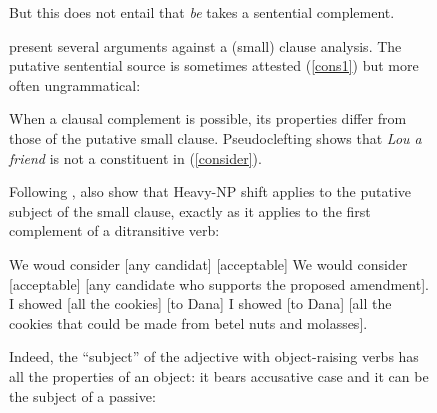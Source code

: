 \documentclass[output=paper
                ,modfonts
                ,nonflat
	        ,collection
	        ,collectionchapter
	        ,collectiontoclongg
 	        ,biblatex
                ,babelshorthands
                ,newtxmath
                ,draftmode
                ,colorlinks, citecolor=brown
]{./langsci/langscibook}
\begin{document}
\begin{figure}
But this does not entail that \emph{be} takes a sentential complement. 




\citet[Chapter~3]{PollardandSag1994} present several arguments against a (small) clause analysis. The putative sentential source is sometimes attested (\ref{cons1}) but more often ungrammatical:

	
\eal
{}
\zl

	
When a clausal complement is possible, its properties differ from those of the putative small clause. Pseudoclefting shows that \textit{Lou a friend} is not a constituent in (\ref{consider}).

\eal
{}
\zl

Following \citet{Bresnan1982}, \citet[113]{PollardandSag1994} also show that Heavy-NP shift applies to the putative subject of the small clause, exactly as it applies to the first complement of a ditransitive verb:

\begin{exe}
\ex \begin{xlist}
\ex   We woud consider [any candidat] [acceptable]
\ex We would consider [acceptable]  [any candidate who supports the proposed amendment].
\ex   I showed [all the cookies] [to Dana]
\ex I showed [to Dana]  [all the cookies that could be made from betel nuts and molasses].  
\end{xlist}

\end{exe}

 Indeed, the ``subject'' of the adjective with object-raising verbs has all the properties of an
 object: it bears accusative case and it can be the subject of a passive:


\end{figure}
\end{document}
